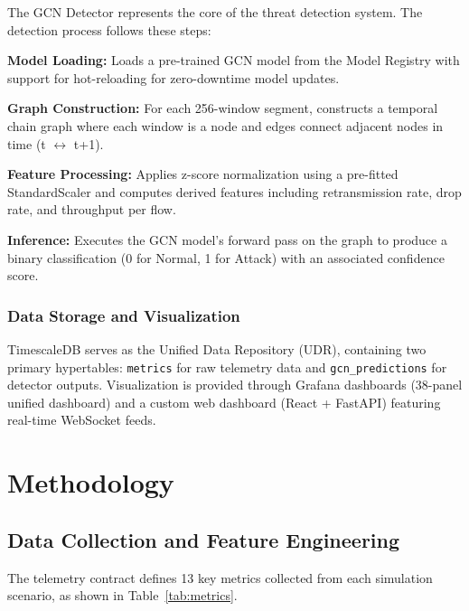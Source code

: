 \documentclass[conference]{IEEEtran}
\begin{document}
The GCN Detector represents the core of the threat detection system. The detection process follows these steps:

\textbf{Model Loading:} Loads a pre-trained GCN model from the Model Registry with support for hot-reloading for zero-downtime model updates.

\textbf{Graph Construction:} For each 256-window segment, constructs a temporal chain graph where each window is a node and edges connect adjacent nodes in time (t $\leftrightarrow$ t+1).

\textbf{Feature Processing:} Applies z-score normalization using a pre-fitted StandardScaler and computes derived features including retransmission rate, drop rate, and throughput per flow.

\textbf{Inference:} Executes the GCN model's forward pass on the graph to produce a binary classification (0 for Normal, 1 for Attack) with an associated confidence score.

\subsubsection{Data Storage and Visualization}

TimescaleDB serves as the Unified Data Repository (UDR), containing two primary hypertables: \texttt{metrics} for raw telemetry data and \texttt{gcn\_predictions} for detector outputs. Visualization is provided through Grafana dashboards (38-panel unified dashboard) and a custom web dashboard (React + FastAPI) featuring real-time WebSocket feeds.

\section{Methodology}
\label{sec:methodology}

\subsection{Data Collection and Feature Engineering}

The telemetry contract defines 13 key metrics collected from each simulation scenario, as shown in Table~\ref{tab:metrics}.
\end{document}
